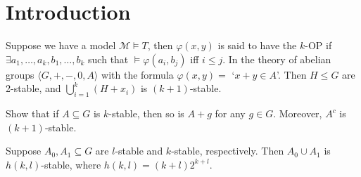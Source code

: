 \documentclass{article}
\let\models\vDash
\begin{document}
\maketitle

\tableofcontents

\clearpage
\section{Introduction}
Suppose we have a model $\mathscr{M} \models T$, then $\varphi(x,y)$ is said to have the $k$-OP if $\exists a_1, \dotsc, a_k, b_1, \dotsc, b_k$ such that $\models \varphi(a_i, b_j)$ iff $i \leq j$.
In the theory of abelian groups $\langle G, + , -, 0, A\rangle$ with the formula $\varphi(x,y) =$ `$x+y \in A$'.
Then $H \leq G$ are 2-stable, and $\bigcup_{i=1}^k (H + x_i)$ is $(k+1)$-stable.
\begin{ex}
  Show that if $A \subseteq G$ is $k$-stable, then so is $A+g$ for any $g \in G$. Moreover, $A^c$ is $(k+1)$-stable.
\end{ex}
\begin{lemma}
  Suppose $A_0, A_1 \subseteq G$ are $l$-stable and $k$-stable, respectively.
  Then $A_0 \cup A_1$ is $h(k,l)$-stable, where $h(k,l) = (k+l)2^{k+l}$.
\end{lemma}
\end{document}

